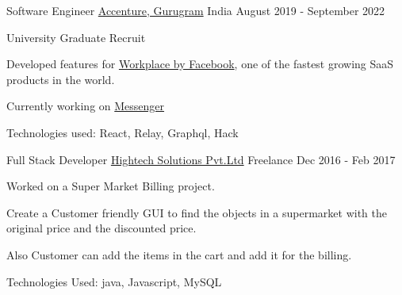 \begin{cventries}

  \cventry
  {Software Engineer}
  {\href{https://www.facebook.com}{Accenture, Gurugram}}
  {India}
  {August 2019 - September 2022}
  {
    \begin{cvitems}
    \item University Graduate Recruit
    \item Developed features for \href{https://www.workplace.com}{Workplace by
        Facebook}, one of the fastest growing SaaS products in the world.
    \item Currently working on \href{https://www.messenger.com}{Messenger}
      \ifdefined \ONEPAGE \else
    \item Technologies used: React, Relay, Graphql, Hack
      \fi
    \end{cvitems}
  }
  \cventry
  {Full Stack Developer}
  {\href{http://www.localites.com}{Hightech Solutions Pvt.Ltd}}
  {Freelance}
  {Dec 2016 - Feb 2017}
  {
    \begin{cvitems}
    \item Worked on a Super Market Billing project.
    \item Create a Customer friendly GUI to find the objects in a supermarket with the original price and the discounted price.
    \item Also Customer can add the items in the cart and add it for the billing.
        \ifdefined \ONEPAGE \else
    \item Technologies Used: java, Javascript, MySQL
        \fi
    \end{cvitems}
  }

\end{cventries}
\vspace{-2mm}


